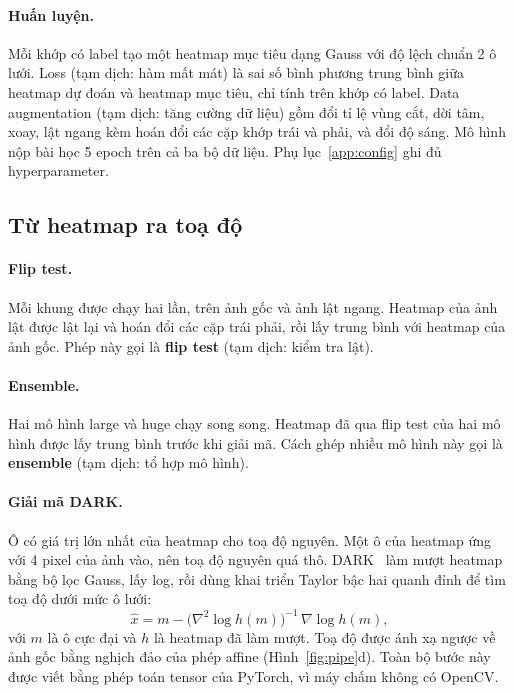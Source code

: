 \documentclass[11pt,a4paper]{article}
\begin{document}
\paragraph{Huấn luyện.} Mỗi khớp có label tạo một heatmap mục tiêu dạng Gauss với độ lệch chuẩn 2 ô lưới. Loss (tạm dịch: hàm mất mát) là sai số bình phương trung bình giữa heatmap dự đoán và heatmap mục tiêu, chỉ tính trên khớp có label. Data augmentation (tạm dịch: tăng cường dữ liệu) gồm đổi tỉ lệ vùng cắt, dời tâm, xoay, lật ngang kèm hoán đổi các cặp khớp trái và phải, và đổi độ sáng. Mô hình nộp bài học 5 epoch trên cả ba bộ dữ liệu. Phụ lục~\ref{app:config} ghi đủ hyperparameter.

\subsection{Từ heatmap ra toạ độ}

\paragraph{Flip test.} Mỗi khung được chạy hai lần, trên ảnh gốc và ảnh lật ngang. Heatmap của ảnh lật được lật lại và hoán đổi các cặp trái phải, rồi lấy trung bình với heatmap của ảnh gốc. Phép này gọi là \textbf{flip test} (tạm dịch: kiểm tra lật).

\paragraph{Ensemble.} Hai mô hình large và huge chạy song song. Heatmap đã qua flip test của hai mô hình được lấy trung bình trước khi giải mã. Cách ghép nhiều mô hình này gọi là \textbf{ensemble} (tạm dịch: tổ hợp mô hình).

\paragraph{Giải mã DARK.} Ô có giá trị lớn nhất của heatmap cho toạ độ nguyên. Một ô của heatmap ứng với 4 pixel của ảnh vào, nên toạ độ nguyên quá thô. DARK~\cite{dark} làm mượt heatmap bằng bộ lọc Gauss, lấy log, rồi dùng khai triển Taylor bậc hai quanh đỉnh để tìm toạ độ dưới mức ô lưới:
\begin{equation}
\hat x = m - \big(\nabla^2 \log h(m)\big)^{-1}\,\nabla\log h(m),
\end{equation}
với $m$ là ô cực đại và $h$ là heatmap đã làm mượt. Toạ độ được ánh xạ ngược về ảnh gốc bằng nghịch đảo của phép affine (Hình~\ref{fig:pipe}d). Toàn bộ bước này được viết bằng phép toán tensor của PyTorch, vì máy chấm không có OpenCV.
\end{document}
